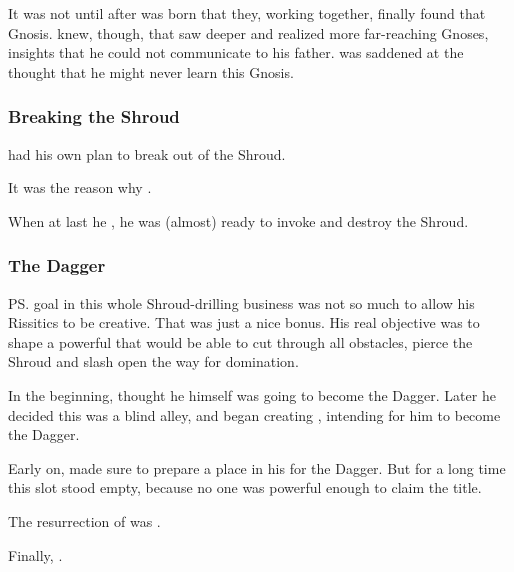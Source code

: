 It was not until after  was born that they, working together, finally found that Gnosis. 
\Secherdamon{} knew, though, that \Vizsherioch{} saw deeper and realized more far-reaching Gnoses, insights that he could not communicate to his father. 
\Secherdamon{} was saddened at the thought that he might never learn this Gnosis. 





\subsubsection{Breaking the Shroud}
\Secherdamon{} had his own plan to break out of the Shroud. 

It was the reason why . 

When at last he , he was (almost) ready to invoke  and destroy the Shroud. 





\subsubsection{The Dagger}
%
\ps{\Secherdamon} goal in this whole Shroud-drilling business was not so much to allow his Rissitics to be creative. 
That was just a nice bonus.
His real objective was to shape a powerful \vertex{} that would be able to cut through all obstacles, pierce the Shroud and slash open the way for \xsic{} domination. 

In the beginning, \Secherdamon{} thought he himself was going to become the Dagger. 
Later he decided this was a blind alley, and began creating \Vizsherioch, intending for him to become the Dagger. 

Early on, \Secherdamon{} made sure to prepare a place in his \matrix{} for the Dagger. 
But for a long time this slot stood empty, because no one was powerful enough to claim the title. 

The resurrection of \Nithdornazsh{} was . 

Finally, . 









